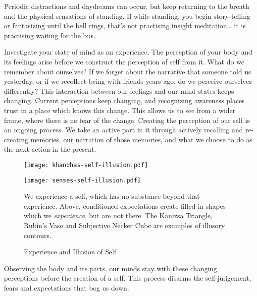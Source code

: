 Periodic distractions and daydreams can occur, but keep returning to the
breath and the physical sensations of standing. If while standing, you
begin story-telling or fantasizing until the bell rings, that's not
practising insight meditation\ldots{} it is practising waiting for the
bus.


\enlargethispage{\baselineskip}

Investigate your state of mind as an experience. The perception of your
body and its feelings arise before we construct the perception of self
from it. What do we remember about ourselves? If we forget about the
narrative that someone told us yesterday, or if we recollect being with
friends years ago, do we perceive ourselves differently? This
interaction between our feelings and our mind states keeps changing.
Current perceptions keep changing, and recognizing awareness places
trust in a place which knows this change. This allows us to see from a
wider frame, where there is no fear of the change. Creating the
perception of our self is an ongoing process. We take an active part in
it through actively recalling and re-creating memories, our narration of
those memories, and what we choose to do as the next action in the
present.

\clearpage

\enlargethispage*{3\baselineskip}

\begin{figure}[h]
\caption{Experience and Illusion of Self}\label{fig-illusion-of-self}

\centering

\texttt{[image: khandhas-self-illusion.pdf]}

\bigskip

\texttt{[image: senses-self-illusion.pdf]}

\bigskip

We experience a self, which has no substance beyond that experience.
Above, conditioned expectations create filled-in shapes which we \emph{experience}, but are not there.
The Kanizsa Triangle, Rubin's Vase and Subjective Necker Cube are examples of illusory contours.

\end{figure}

\clearpage


Observing the body and its parts, our minds stay with these changing
perceptions before the creation of a self. This process disarms the
self-judgement, fears and expectations that bog us down.

